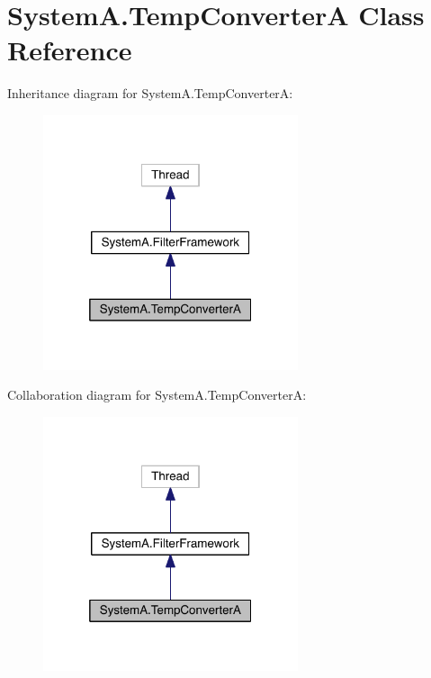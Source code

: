 \hypertarget{class_system_a_1_1_temp_converter_a}{}\section{System\+A.\+Temp\+Converter\+A Class Reference}
\label{class_system_a_1_1_temp_converter_a}


Inheritance diagram for System\+A.\+Temp\+Converter\+A\+:\nopagebreak
\begin{figure}[H]
\begin{center}
\leavevmode
\includegraphics[width=212pt]{class_system_a_1_1_temp_converter_a__inherit__graph}
\end{center}
\end{figure}


Collaboration diagram for System\+A.\+Temp\+Converter\+A\+:\nopagebreak
\begin{figure}[H]
\begin{center}
\leavevmode
\includegraphics[width=212pt]{class_system_a_1_1_temp_converter_a__coll__graph}
\end{center}
\end{figure}
